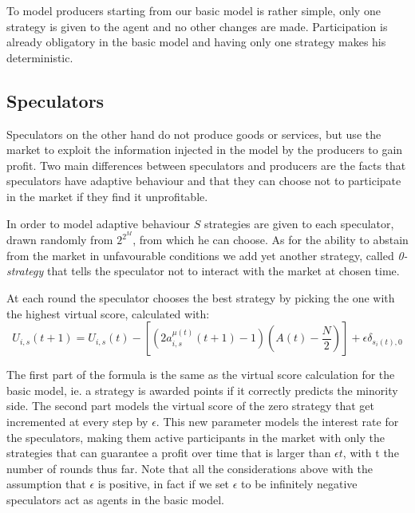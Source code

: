 To model producers starting from our basic model is rather simple, only one strategy is given to the agent and no other changes are made.
Participation is already obligatory in the basic model and having only one strategy makes his deterministic.

\subsection{Speculators}

Speculators on the other hand do not produce goods or services, but use the market to exploit the information injected in the model by the producers to gain profit.
Two main differences between speculators and producers are the facts that speculators have adaptive behaviour and that they can choose not to participate in the market if they find it unprofitable.

In order to model adaptive behaviour $S$ strategies are given to each speculator, drawn randomly from $2^{2^M}$, from which he can choose.
As for the ability to abstain from the market in unfavourable conditions we add yet another strategy, called \textit{0-strategy} that tells the speculator not to interact with the market at chosen time.

At each round the speculator chooses the best strategy by picking the one with the highest virtual score, calculated with:
\begin{displaymath}
U_{i,s}(t+1) = U_{i,s}(t) - [(2a_{i,s}^{\mu(t)}(t+1)-1)(A(t)-\frac{N}{2}) ] + \epsilon\delta_{s_i(t),0}
\end{displaymath}

The first part of the formula is the same as the virtual score calculation for the basic model, ie. a strategy is awarded points if it correctly predicts the minority side.
The second part models the virtual score of the zero strategy that get incremented at every step by $\epsilon$.
This new parameter models the interest rate for the speculators, making them active participants in the market with only the strategies that can guarantee a profit over time that is larger than $\epsilon t$, with t the number of rounds thus far.
Note that all the considerations above with the assumption that $\epsilon$ is positive, in fact if we set $\epsilon$ to be infinitely negative speculators act as agents in the basic model.
